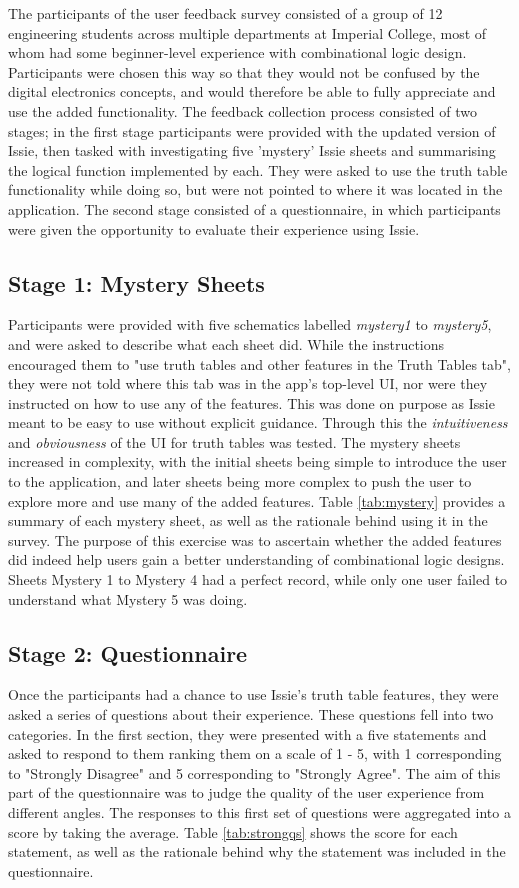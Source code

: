 The participants of the user feedback survey consisted of a group of 12 engineering students across multiple departments at Imperial College, most of whom had some beginner-level experience with combinational logic design. Participants were chosen this way so that they would not be confused by the digital electronics concepts, and would therefore be able to fully appreciate and use the added functionality. The feedback collection process consisted of two stages; in the first stage participants were provided with the updated version of Issie, then tasked with investigating five 'mystery' Issie sheets and summarising the logical function implemented by each. They were asked to use the truth table functionality while doing so, but were not pointed to where it was located in the application. The second stage consisted of a questionnaire, in which participants were given the opportunity to evaluate their experience using Issie.

\subsection{Stage 1: Mystery Sheets}
Participants were provided with five schematics labelled \textit{mystery1} to \textit{mystery5}, and were asked to describe what each sheet did. While the instructions encouraged them to "use truth tables and other features in the Truth Tables tab", they were not told where this tab was in the app's top-level UI, nor were they instructed on how to use any of the features. This was done on purpose as Issie meant to be easy to use without explicit guidance. Through this the \textit{intuitiveness} and \textit{obviousness} of the UI for truth tables was tested. The mystery sheets increased in complexity, with the initial sheets being simple to introduce the user to the application, and later sheets being more complex to push the user to explore more and use many of the added features. Table \ref{tab:mystery} provides a summary of each mystery sheet, as well as the rationale behind using it in the survey. The purpose of this exercise was to ascertain whether the added features did indeed help users gain a better understanding of combinational logic designs. Sheets Mystery 1 to Mystery 4 had a perfect record, while only one user failed to understand what Mystery 5 was doing.

\subsection{Stage 2: Questionnaire}
Once the participants had a chance to use Issie's truth table features, they were asked a series of questions about their experience. These questions fell into two categories. In the first section, they were presented with a five statements and asked to respond to them ranking them on a scale of 1 - 5, with 1 corresponding to "Strongly Disagree" and 5 corresponding to "Strongly Agree". The aim of this part of the questionnaire was to judge the quality of the user experience from different angles. The responses to this first set of questions were aggregated into a score by taking the average. Table \ref{tab:strongqs} shows the score for each statement, as well as the rationale behind why the statement was included in the questionnaire.

